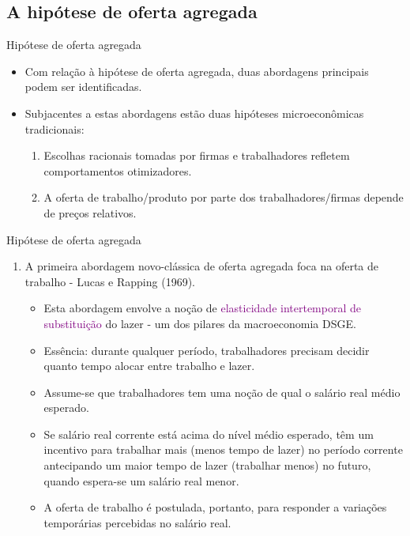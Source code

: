 \documentclass[10pt]{beamer}
\begin{document}
\subsection{A hipótese de oferta agregada}
\begin{frame}{Hipótese de oferta agregada}
    \begin{itemize}
        \item Com relação à hipótese de oferta agregada, duas abordagens principais podem ser identificadas.
        \bigskip
        \item Subjacentes a estas abordagens estão duas hipóteses microeconômicas tradicionais:
        \bigskip
        \begin{enumerate}
            \item Escolhas racionais tomadas por firmas e trabalhadores refletem comportamentos otimizadores.
            \bigskip
            \item A oferta de trabalho/produto por parte dos trabalhadores/firmas depende de preços relativos.
        \end{enumerate}
    \end{itemize}
\end{frame}

\begin{frame}{Hipótese de oferta agregada}
    \begin{enumerate}
        \item A primeira abordagem novo-clássica de oferta agregada foca na oferta de trabalho - Lucas e Rapping (1969).
        \bigskip
        \begin{itemize}
            \item Esta abordagem envolve a noção de \textcolor{purple}{elasticidade intertemporal de substituição} do lazer - um dos pilares da macroeconomia DSGE.
            \bigskip
            \item Essência: durante qualquer período, trabalhadores precisam decidir quanto tempo alocar entre trabalho e lazer.
            \bigskip
            \item Assume-se que trabalhadores tem uma noção de qual o salário real médio esperado.
            \bigskip
            \item Se salário real corrente está acima do nível médio esperado, têm um incentivo para trabalhar mais (menos tempo de lazer) no período corrente antecipando um maior tempo de lazer (trabalhar menos) no futuro, quando espera-se um salário real menor.
            \bigskip
            \item A oferta de trabalho é postulada, portanto, para responder a variações temporárias percebidas no salário real.
        \end{itemize}
    \end{enumerate}
\end{frame}
\end{document}
